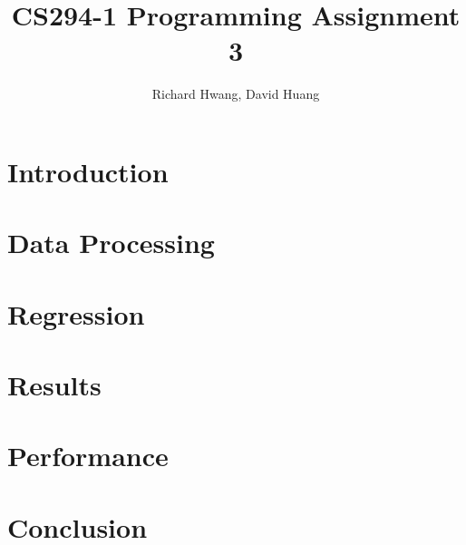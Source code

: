 \documentclass[11pt]{article}
\title{CS294-1 Programming Assignment 3}
\author{Richard Hwang, David Huang}
\begin{document}
\maketitle

\section{Introduction}

\section{Data Processing}

\section{Regression}

\section{Results}

\section{Performance}

\section{Conclusion}
\end{document}
